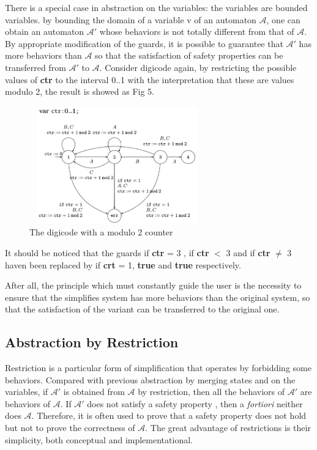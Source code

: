 \documentclass{acmtog} %
\begin{document}
        There is a special case in abstraction on the variables: the variables are bounded variables. by bounding the domain of a variable v of an automaton $\mathcal{A}$, one can obtain an automaton $\mathcal{A}'$ whose behaviors is not totally different from that of $\mathcal{A}$. By appropriate modification of the guards, it is possible to guarantee that $\mathcal{A}'$ has more behaviors than $\mathcal{A}$ so that the satisfaction of safety properties can be transferred from $\mathcal{A}'$ to $\mathcal{A}$. Consider digicode again, by restricting the possible values of \textbf{ctr} to the interval 0..1 with the interpretation that these are values modulo 2, the result is showed as Fig 5.
        \begin{figure}[H]
          \centering
          \includegraphics[width=3.0in, height=2.0in]{7.png}
          \caption{The digicode with a modulo 2 counter}
        \end{figure}
        
        It should be noticed that the guards if \textbf{ctr} = 3 , if \textbf{ctr} $<$ 3 and if \textbf{ctr} $\neq$ 3 haven been replaced by if \textbf{crt} = 1, \textbf{true} and \textbf{true} respectively. 
        
        After all, the principle which must constantly guide the user is the necessity to ensure that the simplifies system has more behaviors than the original system, so that the satisfaction of the variant can be transferred to the original one.
        

    \subsection{Abstraction by Restriction}
        \quad Restriction is a particular form of simplification that operates by forbidding some behaviors. Compared with previous abstraction by merging states and on the variables, if $\mathcal{A}'$ is obtained from $\mathcal{A}$ by restriction, then all the behaviors of $\mathcal{A}'$ are behaviors of $\mathcal{A}$. If $\mathcal{A}'$ does not satisfy a safety property , then a \textit{fortiori} neither does $\mathcal{A}$. Therefore, it is often used to prove that a safety property does not hold but not to prove the correctness of $\mathcal{A}$. The great advantage of restrictions is their simplicity, both conceptual and implementational.
        
\end{document}
